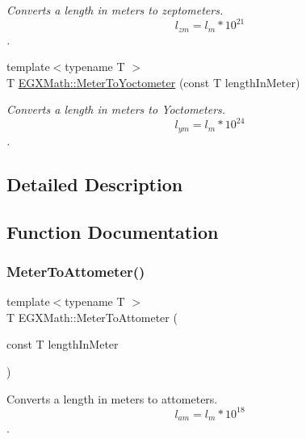\begin{DoxyCompactItemize}
\begin{DoxyCompactList}\small\item\em Converts a length in meters to zeptometers. \[ l_{zm}=l_{m} * 10^{21} \]. \end{DoxyCompactList}\item 
{\footnotesize template$<$typename T $>$ }\\T \mbox{\hyperlink{group___e_g_x_math-_conversions-_length_conversions-_meter-_s_i_ga0a9af3add4234d53c0ea30906ead1c3a}{E\+G\+X\+Math\+::\+Meter\+To\+Yoctometer}} (const T length\+In\+Meter)
\begin{DoxyCompactList}\small\item\em Converts a length in meters to Yoctometers. \[ l_{ym}=l_{m} * 10^{24} \]. \end{DoxyCompactList}\end{DoxyCompactItemize}


\subsection{Detailed Description}


\subsection{Function Documentation}
\mbox{\label{group___e_g_x_math-_conversions-_length_conversions-_meter-_s_i_ga7c27a5231b96b904786f519e8bad257c}} 
\subsubsection{\texorpdfstring{Meter\+To\+Attometer()}{MeterToAttometer()}}
{\footnotesize\ttfamily template$<$typename T $>$ \\
T E\+G\+X\+Math\+::\+Meter\+To\+Attometer (\begin{DoxyParamCaption}\item[{const T}]{length\+In\+Meter }\end{DoxyParamCaption})}



Converts a length in meters to attometers. \[ l_{am}=l_{m} * 10^{18} \]. 

